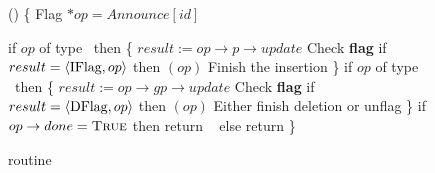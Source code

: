 \begin{figure*}
	\footnotesize
	
	\begin{code}
		() \{ \nlc \n
			Flag $*op = Announce[id]$ \bl \nlc
			
			if $op$ of type \IFlag\ then \{ \nlc \n
				$result := op\rightarrow p\rightarrow update$ \tabtabcom Check {\bf flag}\label{iflag-cas} \nlc
				if $result = \langle \mbox{IFlag},op \rangle$ then $(op)$ \tabtabcom Finish the insertion\label{finish-insert}\nlc
			\p \} \nlc
			if $op$ of type \DFlag\ then \{ \nlc \n
				$result := op\rightarrow gp\rightarrow update$ \tabtabcom Check {\bf flag}\label{dflag-cas}\nlc
				if $result = \langle \mbox{DFlag}, op \rangle$ then $(op)$ \label{delete-true} \tabtabcom Either finish deletion or unflag \nlc
			\p \} \nlc
			if $op\rightarrow done = \mbox{\sc True}$ then return \TRUE\ \nlc
			else return \FAIL \nlc
		\p \}
			
			
	\end{code}

\caption{ routine}
\end{figure*}



